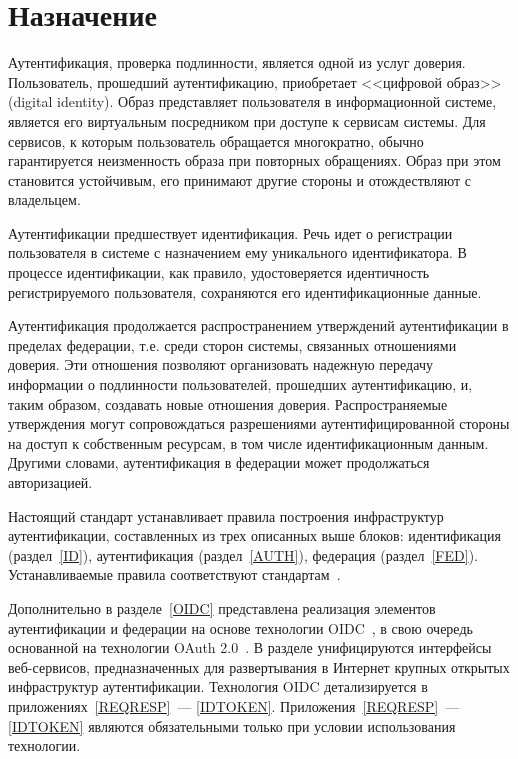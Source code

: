 \section{Назначение}\label{COMMON.Purpose}

Аутентификация, проверка подлинности, является одной из услуг доверия. 
%
Пользователь, прошедший аутентификацию, приобретает <<цифровой образ>> 
(digital identity). Образ представляет пользователя в информационной системе, 
является его виртуальным посредником при доступе к сервисам системы.
%
Для сервисов, к которым пользователь обращается многократно, обычно 
гарантируется неизменность образа при повторных обращениях. 
%
Образ при этом становится устойчивым, его принимают другие стороны 
и отождествляют с владельцем.

Аутентификации предшествует идентификация. Речь идет о регистрации пользователя
в системе с назначением ему уникального идентификатора. В процессе
идентификации, как правило, удостоверяется идентичность регистрируемого
пользователя, сохраняются его идентификационные данные.

Аутентификация продолжается распространением утверждений аутентификации в
пределах федерации, т.е. среди сторон системы, связанных отношениями 
доверия.
%
Эти отношения позволяют организовать надежную передачу информации о подлинности 
пользователей, прошедших аутентификацию, и, таким образом, создавать новые отношения 
доверия.
%
Распространяемые утверждения могут сопровождаться разрешениями
аутентифицированной стороны на доступ к собственным ресурсам, в том числе
идентификационным данным. Другими словами, аутентификация в федерации может
продолжаться авторизацией.


Настоящий стандарт устанавливает правила построения инфраструктур 
аутентификации, составленных из трех описанных выше блоков: 
идентификация (раздел~\ref{ID}), аутентификация (раздел~\ref{AUTH}), 
федерация (раздел~\ref{FED}).
%           
Устанавливаемые правила соответствуют 
стандартам~\cite{SP800-63-3,SP800-63-3A,SP800-63-3B,SP800-63-3C,ISO29115}. 

Дополнительно в разделе~\ref{OIDC} представлена реализация элементов 
аутентификации и федерации на основе технологии OIDC~\cite{OIDC}, в свою 
очередь основанной на технологии OAuth 2.0~\cite{RFC6749}. В разделе 
унифицируются интерфейсы веб-сервисов, предназначенных для развертывания
в Интернет крупных открытых инфраструктур аутентификации.
%
Технология OIDC детализируется в приложениях~\ref{REQRESP}~--- \ref{IDTOKEN}. 
%
Приложения~\ref{REQRESP}~--- \ref{IDTOKEN} являются обязательными только при 
условии использования технологии.

